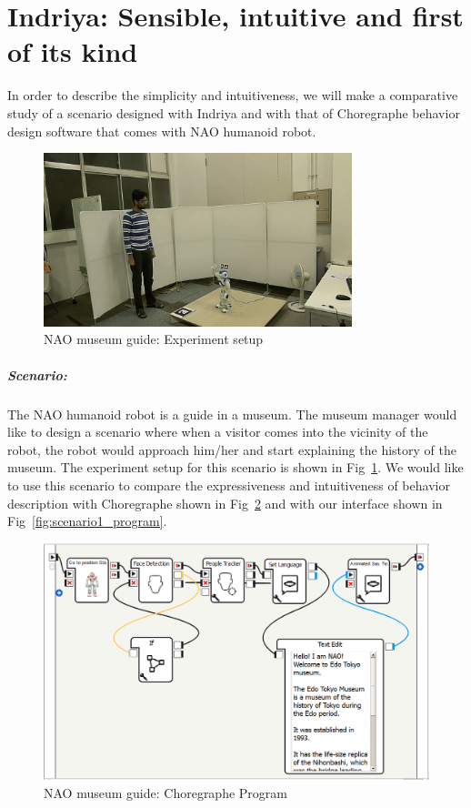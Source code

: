 \section{Indriya: Sensible, intuitive and first of its kind}
In order to describe the simplicity and intuitiveness, we will make a comparative study of a scenario designed with Indriya and with that of Choregraphe behavior design software that comes with NAO humanoid robot. 
\begin{figure}[H]
\centering
\includegraphics[width=0.8\textwidth]{../thesis/assets/scenario_museum.png}
\caption[NAO museum guide: Experiment setup]{NAO museum guide: Experiment setup}
\label{fig:scenario1_setup}
\end{figure}
\subparagraph{Scenario:}The NAO humanoid robot is a guide in a museum. The museum manager would like to design a scenario where when a visitor comes into the vicinity of the robot, the robot would approach him/her and start explaining the history of the museum. The experiment setup for this scenario is shown in Fig~\ref{fig:scenario1_setup}. We would like to use this scenario to compare the expressiveness and intuitiveness of behavior description with Choregraphe \cite{NaoRobot} shown in Fig~\ref{fig:scenario1_program_choregraphe} and with our interface shown in Fig~\ref{fig:scenario1_program}.
\begin{figure}[H]
\centering
\includegraphics[width=\textwidth]{../thesis/assets/scenario_museum_choregraphe2.png}
\caption[NAO museum guide: Choregraphe Program]{NAO museum guide: Choregraphe Program}
\label{fig:scenario1_program_choregraphe}
\end{figure}
